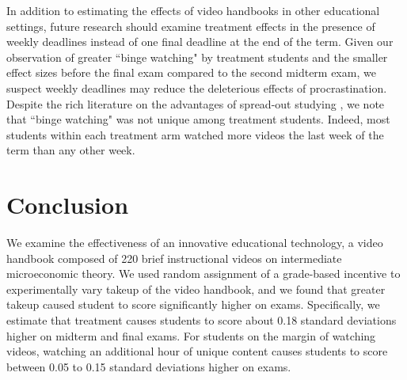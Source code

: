 \documentclass[12pt]{article}
\begin{document}

In addition to estimating the effects of video handbooks in other educational settings, future research should examine treatment effects in the presence of weekly deadlines instead of one final deadline at the end of the term. Given our observation of greater ``binge watching" by treatment students and the smaller effect sizes before the final exam compared to the second midterm exam, we suspect weekly deadlines may reduce the deleterious effects of procrastination. Despite the rich literature on the advantages of spread-out studying \parencite{kornell2009, cpvw2006}, we note that ``binge watching" was not unique among treatment students. Indeed, most students within each treatment arm watched more videos the last week of the term than any other week.


\section{Conclusion} \label{conclusion}

We examine the effectiveness of an innovative educational technology, a video handbook composed of 220 brief instructional videos on intermediate microeconomic theory. We used random assignment of a grade-based incentive to experimentally vary takeup of the video handbook, and we found that greater takeup caused student to score significantly higher on exams. Specifically, we estimate that treatment causes students to score about 0.18 standard deviations higher on midterm and final exams. For students on the margin of watching videos, watching an additional hour of unique content causes students to score between 0.05 to 0.15 standard deviations higher on exams.
\end{document}
